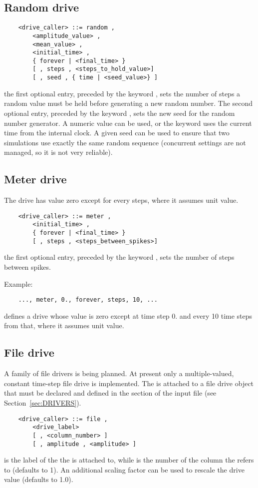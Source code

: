 \subsection{Random drive}
\begin{verbatim}
    <drive_caller> ::= random ,
        <amplitude_value> ,
        <mean_value> ,
        <initial_time> ,
        { forever | <final_time> }
        [ , steps , <steps_to_hold_value>]
        [ , seed , { time | <seed_value>} ]
\end{verbatim}
the first optional entry, preceded by the keyword , sets the
number of steps a random value must be held before generating a new
random number. The second optional entry, preceded by the keyword
, sets the new seed for the random number generator. A numeric
value can be used, or the keyword  uses the current time from
the internal clock. A given seed can be used to ensure that two
simulations use exactly the same random sequence (concurrent settings 
are not managed, so it is not very reliable).

\subsection{Meter drive}
The  drive has value zero except for every  steps,
where it assumes unit value.
\begin{verbatim}
    <drive_caller> ::= meter ,
        <initial_time> ,
        { forever | <final_time> }
        [ , steps , <steps_between_spikes>]
\end{verbatim}
the first optional entry, preceded by the keyword , sets the
number of steps between spikes.

\noindent
Example:
\begin{verbatim}
    ..., meter, 0., forever, steps, 10, ...
\end{verbatim}
defines a drive whose value is zero except at time step 0. 
and every 10 time steps from that, where it assumes unit value.

\subsection{File drive}\label{sec:FILE-DRIVE}
A family of file drivers is being planned.
At present only a multiple-valued, constant time-step file drive is
implemented.
The  is attached to a file drive object that must be declared
and defined in the  section 
of the input file (see Section~\ref{sec:DRIVERS}).
\begin{verbatim}
    <drive_caller> ::= file ,
        <drive_label>
        [ , <column_number> ]
        [ , amplitude , <amplitude> ]
\end{verbatim}
 is the label of the  
the  is attached to, while
 is the number of the column the 
refers to (defaults to 1).
An additional scaling factor  can be used to rescale
the drive value (defaults to 1.0).

